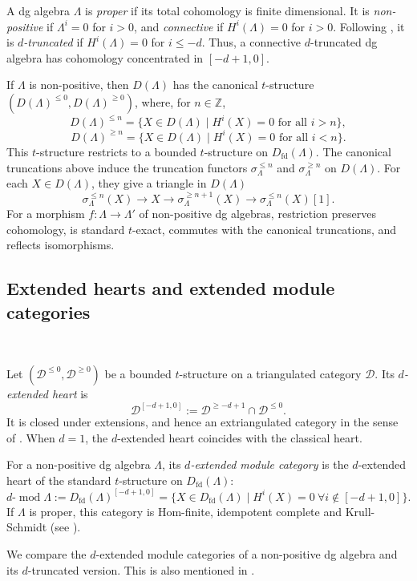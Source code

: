 \documentclass[11pt,a4paper,reqno]{amsart}
\theoremstyle{plain}
\numberwithin{equation}{section}
\theoremstyle{definition}
\renewcommand{\mod}{\operatorname{mod}}
\newcommand{\emod}[2]{#1\text{-}\!\mod #2}
\newcommand{\eheart}[2]{#2^{[-#1+1,0]}}
\newcommand{\D}{\mathcal{D}}
\begin{document}
A dg algebra $\Lambda$ is \emph{proper} if its total cohomology is finite dimensional. It is \emph{non-positive} if $\Lambda^i=0$ for $i>0$, and \emph{connective} if $H^i(\Lambda)=0$ for $i>0$. Following \cite[Definition~1.1]{M2}, it is \emph{$d$-truncated} if $H^i(\Lambda)=0$ for $i\leq-d$. Thus, a connective $d$-truncated dg algebra has cohomology concentrated in $[-d+1,0]$. 

If $\Lambda$ is non-positive, then $D(\Lambda)$ has the canonical $t$-structure $(D(\Lambda)^{\leq0},D(\Lambda)^{\geq0})$, where, for $n\in\mathbb Z$,
\[D(\Lambda)^{\leq n}=\{X\in D(\Lambda)\mid H^i(X)=0\text{ for all }i>n\},\]
\[
D(\Lambda)^{\geq n}=\{X\in D(\Lambda)\mid H^i(X)=0\text{ for all }i<n\}.
\]
This $t$-structure restricts to a bounded $t$-structure on $D_{\mathrm{fd}}(\Lambda)$. The canonical truncations above induce the truncation functors $\sigma_\Lambda^{\leq n}$ and $\sigma_\Lambda^{\geq n}$ on $D(\Lambda)$. For each $X\in D(\Lambda)$, they give a triangle in $D(\Lambda)$
\[
 \sigma_\Lambda^{\leq n}(X)\to X\to\sigma_\Lambda^{\geq n+1}(X)\to\sigma_\Lambda^{\leq n}(X)[1].
\]
For a morphism $f\colon\Lambda\to\Lambda'$ of non-positive dg algebras, restriction preserves cohomology, is standard $t$-exact, commutes with the canonical truncations, and reflects isomorphisms. 

\subsection{Extended hearts and extended module categories}\ 

Let $(\D^{\leq0},\D^{\geq0})$ be a bounded $t$-structure on a triangulated category $\D$. Its \emph{$d$-extended heart} is
\[
 \eheart{d}{\D}
 :=\D^{\geq-d+1}\cap\D^{\leq0}.
\]
It is closed under extensions, and hence an extriangulated category in the sense of \cite{NP}. When $d=1$, the $d$-extended heart coincides with the classical heart.

For a non-positive dg algebra $\Lambda$, its \emph{$d$-extended module category} is the $d$-extended heart of the standard $t$-structure on $D_{\mathrm{fd}}(\Lambda)$:
\[
 \emod{d}{\Lambda}:=D_{\mathrm{fd}}(\Lambda)^{[-d+1,0]}=\{X\in D_{\mathrm{fd}}(\Lambda)\mid H^i(X)=0\ \forall i\notin [-d+1,0]\}.
\]
If $\Lambda$ is proper, this category is Hom-finite, idempotent complete and Krull-Schmidt (see \cite{MP}). 

We compare the $d$-extended module categories of a non-positive dg algebra and its $d$-truncated version. This is also mentioned in \cite[Remark~1.10]{M2}.
\end{document}
